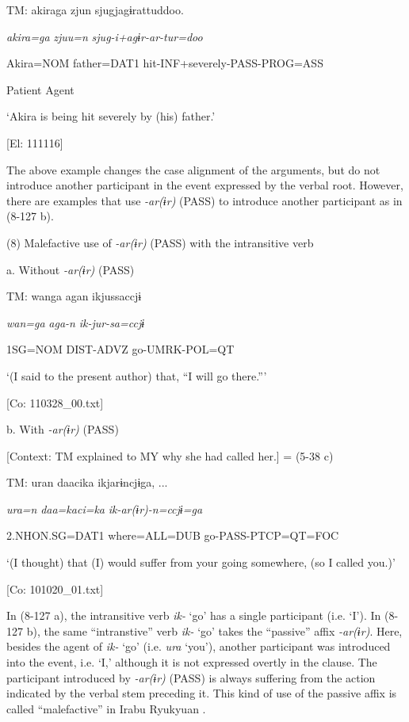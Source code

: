     TM:  akiraga  zjun  sjugjagɨrattuddoo.

      \textit{akira=ga}  \textit{zjuu=n}  \textit{sjug-i+agɨr-ar{}-tur=doo}

      Akira=NOM  father=DAT1  hit-INF+severely-PASS-PROG=ASS

      Patient  Agent  

      ‘Akira is being hit severely by (his) father.’

      [El: 111116]

  The above example changes the case alignment of the arguments, but do not introduce another participant in the event expressed by the verbal root. However, there are examples that use \textit{{}-ar(ɨr)} (PASS) to introduce another participant as in (8-127 b).

(8)  Malefactive use of \textit{{}-ar(ɨr)} (PASS) with the intransitive verb

  a.  Without \textit{{}-ar(ɨr)} (PASS)

    TM:  wanga  agan  ikjussaccjɨ

      \textit{wan=ga}  \textit{aga-n}  \textit{ik{}-jur-sa=ccjɨ}

      1SG=NOM  DIST-ADVZ  go-UMRK-POL=QT

      ‘(I said to the present author) that, “I will go there.”’

      [Co: 110328\_00.txt]

  b.  With \textit{{}-ar(ɨr)} (PASS)

    [Context: TM explained to MY why she had called her.] = (5-38 c)

    TM:  uran  daacika  ikjarɨncjɨga, ...

      \textit{ura=n}  \textit{daa=kaci=ka}  \textit{ik-ar(ɨr){}-n=ccjɨ=ga}

      2.NHON.SG=DAT1  where=ALL=DUB  go-PASS-PTCP=QT=FOC

      ‘(I thought) that (I) would suffer from your going somewhere, (so I called you.)’

      [Co: 101020\_01.txt]

In (8-127 a), the intransitive verb \textit{ik-} ‘go’ has a single participant (i.e. ‘I’). In (8-127 b), the same “intranstive” verb \textit{ik-} ‘go’ takes the “passive” affix \textit{{}-ar(ɨr)}. Here, besides the agent of \textit{ik-} ‘go’ (i.e. \textit{ura} ‘you’), another participant was introduced into the event, i.e. ‘I,’ although it is not expressed overtly in the clause. The participant introduced by \textit{{}-ar(ɨr)} (PASS) is always suffering from the action indicated by the verbal stem preceding it. This kind of use of the passive affix is called “malefactive” in Irabu Ryukyuan \citep[493-498]{Shimoji2008}.


